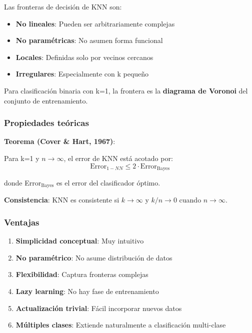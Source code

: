 \documentclass[
  doc,
  floatsintext,
  longtable,
  a4paper,
  nolmodern,
  notxfonts,
  notimes,
  12pt,
  colorlinks=true,linkcolor=blue,citecolor=blue,urlcolor=blue]{apa7}
\providecommand{\tightlist}{%
  \setlength{\itemsep}{0pt}\setlength{\parskip}{0pt}}
\begin{document}
Las fronteras de decisión de KNN son:

\begin{itemize}
\tightlist
\item
  \textbf{No lineales}: Pueden ser arbitrariamente complejas
\item
  \textbf{No paramétricas}: No asumen forma funcional
\item
  \textbf{Locales}: Definidas solo por vecinos cercanos
\item
  \textbf{Irregulares}: Especialmente con k pequeño
\end{itemize}

Para clasificación binaria con k=1, la frontera es la \textbf{diagrama
de Voronoi} del conjunto de entrenamiento.

\subsubsection{Propiedades teóricas}\label{propiedades-teuxf3ricas}

\textbf{Teorema (Cover \& Hart, 1967)}:

Para k=1 y \(n \to \infty\), el error de KNN está acotado por: \[
\text{Error}_{1-NN} \leq 2 \cdot \text{Error}_{\text{Bayes}}
\]

donde Error\(_{\text{Bayes}}\) es el error del clasificador óptimo.

\textbf{Consistencia}: KNN es consistente si \(k \to \infty\) y
\(k/n \to 0\) cuando \(n \to \infty\).

\subsubsection{Ventajas}\label{ventajas-1}

\begin{enumerate}
\def\labelenumi{\arabic{enumi}.}
\tightlist
\item
  \textbf{Simplicidad conceptual}: Muy intuitivo
\item
  \textbf{No paramétrico}: No asume distribución de datos
\item
  \textbf{Flexibilidad}: Captura fronteras complejas
\item
  \textbf{Lazy learning}: No hay fase de entrenamiento
\item
  \textbf{Actualización trivial}: Fácil incorporar nuevos datos
\item
  \textbf{Múltiples clases}: Extiende naturalmente a clasificación
  multi-clase
\end{enumerate}
\end{document}
